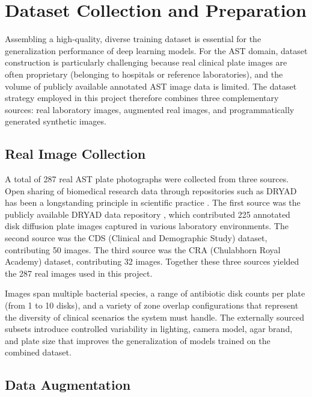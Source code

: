 \section{Dataset Collection and Preparation}

Assembling a high-quality, diverse training dataset is essential for the generalization
performance of deep learning models. For the AST domain, dataset construction is particularly
challenging because real clinical plate images are often proprietary (belonging to hospitals
or reference laboratories), and the volume of publicly available annotated AST image data is
limited. The dataset strategy employed in this project therefore combines three complementary
sources: real laboratory images, augmented real images, and programmatically generated
synthetic images.

\subsection{Real Image Collection}

A total of 287 real AST plate photographs were collected from three sources. Open sharing of
biomedical research data through repositories such as DRYAD has been a longstanding principle
in scientific practice \cite{iom1996}. The first source was the publicly available DRYAD data
repository \cite{giske2024dryad}, which contributed 225 annotated disk diffusion plate images
captured in various laboratory environments. The second source was the
CDS (Clinical and Demographic Study) dataset, contributing 50 images. The third source was
the CRA (Chulabhorn Royal Academy) dataset, contributing 32 images. Together these three
sources yielded the 287 real images used in this project.

Images span multiple bacterial species, a range of antibiotic disk counts per plate
(from 1 to 10 disks), and a variety of zone overlap configurations that represent the
diversity of clinical scenarios the system must handle. The externally sourced subsets
introduce controlled variability in lighting, camera model, agar brand, and plate size that
improves the generalization of models trained on the combined dataset.

\subsection{Data Augmentation}


